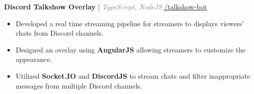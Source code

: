 \documentclass[11pt]{article}
\begin{document}

 
  \hspace{10pt}\textbf{Discord Talkshow Overlay} {\small | \textit{\textcolor{gray}{TypeScript, NodeJS}}} \hfill {\small \href{https://github.com/huynd2001/talkshow-bot}{\faGithub{}/talkshow-bot}}
  \begin{itemize}[leftmargin=31pt]
  \vspace{-10pt}
    \setlength\itemsep{-5pt}
      \item {\small Developed a real time streaming pipeline for streamers to displays viewers' chats from Discord channels.}
      \item {\small Designed an overlay using \textbf{AngularJS} allowing streamers to customize the appearance.}
      \item {\small Utilized \textbf{Socket.IO} and \textbf{DiscordJS} to stream chats and filter inappropriate messages from multiple Discord channels.}
      \vspace{-5pt}
  \end{itemize}
\end{document}

